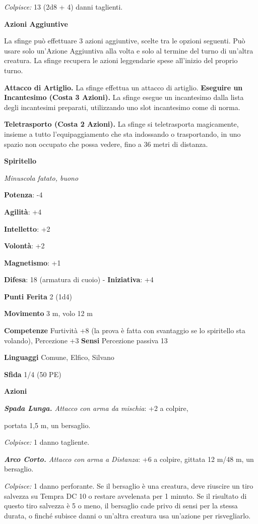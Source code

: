 \begin{multicols}{2}
\emph{Colpisce:} 13 (2d8 + 4) danni taglienti.

\textbf{Azioni Aggiuntive}

La sfinge può effettuare 3 azioni aggiuntive, scelte tra le opzioni
seguenti. Può usare solo un'Azione Aggiuntiva alla volta e solo al
termine del turno di un'altra creatura. La sfinge recupera le azioni
leggendarie spese all'inizio del proprio turno.

\textbf{Attacco di Artiglio.} La sfinge effettua un attacco di artiglio.
\textbf{Eseguire un Incantesimo (Costa 3 Azioni).} La sfinge esegue un
incantesimo dalla lista degli incantesimi preparati, utilizzando uno
slot incantesimo come di norma.

\textbf{Teletrasporto (Costa 2 Azioni).} La sfinge si teletrasporta
magicamente, insieme a tutto l'equipaggiamento che sta indossando o
trasportando, in uno spazio non occupato che possa vedere, fino a 36
metri di distanza.

\textbf{Spiritello}

\emph{Minuscola fatato, buono}

\textbf{Potenza}: -4

\textbf{Agilità}: +4

\textbf{Intelletto}: +2

\textbf{Volontà}: +2

\textbf{Magnetismo}: +1

\textbf{Difesa}: 18 (armatura di cuoio) - \textbf{Iniziativa}: +4

\textbf{Punti Ferita} 2 (1d4)

\textbf{Movimento} 3 m, volo 12 m

\textbf{Competenze} Furtività +8 (la prova è fatta con svantaggio se lo
spiritello sta volando), Percezione +3 \textbf{Sensi} Percezione passiva
13

\textbf{Linguaggi} Comune, Elfico, Silvano

\textbf{Sfida} 1/4 (50 PE)

\textbf{Azioni}

\emph{\textbf{Spada Lunga.} Attacco con arma da mischia}: +2 a colpire,

portata 1,5 m, un bersaglio.

\emph{Colpisce:} 1 danno tagliente.

\emph{\textbf{Arco Corto.} Attacco con arma a Distanza}: +6 a colpire,
gittata 12 m/48 m, un bersaglio.

\emph{Colpisce:} 1 danno perforante. Se il bersaglio è una creatura,
deve riuscire un tiro salvezza su Tempra DC 10 o restare
avvelenata per 1 minuto. Se il risultato di questo tiro salvezza è 5 o
meno, il bersaglio cade privo di sensi per la stessa durata, o finché
subisce danni o un'altra creatura usa un'azione per risvegliarlo.


\end{multicols}
